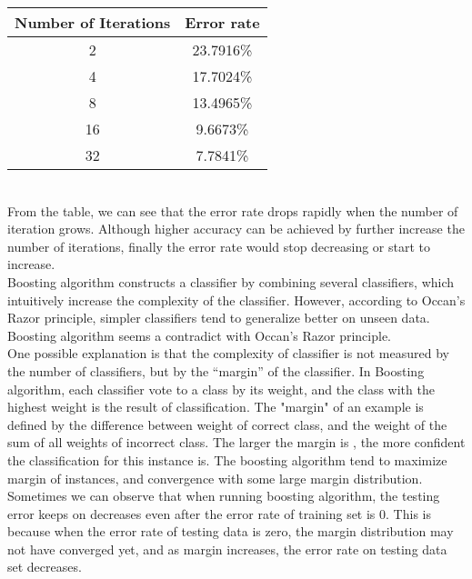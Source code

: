 \documentclass[a4paper,11pt]{article}
\begin{document}
\vspace{0.5cm}
\begin{tabular}{c c}
Number of Iterations	& Error rate\\
\hline \hline
	2		& 23.7916\%\\
	4		& 17.7024\%\\
	8		& 13.4965\%\\
	16		& 9.6673\%\\
    32      & 7.7841\%\\
\end{tabular}
\vspace{0.5cm}\\
From the table, we can see that the error rate drops rapidly when the number of iteration grows. Although higher accuracy can be achieved by further increase the number of iterations, finally the error rate would stop decreasing or start to increase.\\
Boosting algorithm constructs a classifier by combining several classifiers, which intuitively increase the complexity of the classifier. However, according to Occan's Razor principle, simpler classifiers tend to generalize better on unseen data. Boosting algorithm seems a contradict with Occan's Razor principle.\\
One possible explanation is that the complexity of classifier is not measured by the number of classifiers, but by the ``margin'' of the classifier.
In Boosting algorithm, each classifier vote to a class by its weight, and the class with the highest weight is the result of classification. The "margin" of an example is defined by the difference between weight of correct class, and the weight of the sum of all weights of incorrect class. The larger the margin is , the more confident the classification for this instance is. The boosting algorithm tend to maximize margin of instances, and convergence with some large margin distribution. Sometimes we can observe that when running boosting algorithm, the testing error keeps on decreases even after the error rate of training set is 0. This is because when the error rate of testing data is zero, the margin distribution may not have converged yet, and as margin increases, the error rate on testing data set decreases.
\end{document}
